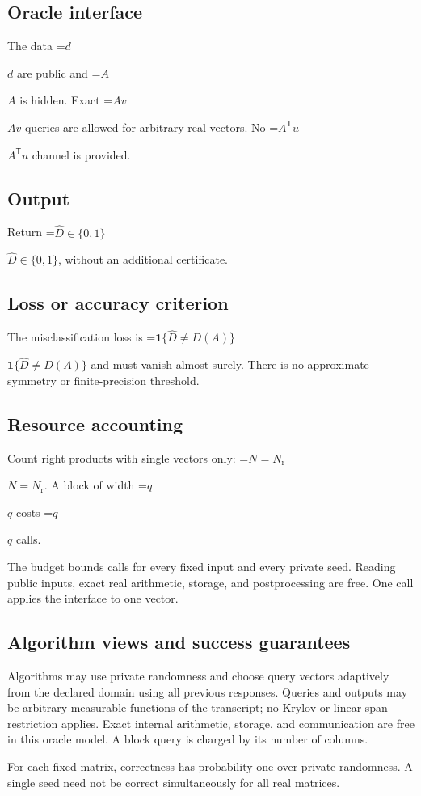 \documentclass[10pt,a4paper]{article}
\newcommand{\AtlasMath}[1]{\par\begingroup\centering\setbox0=\hbox{$\displaystyle #1$}\ifdim\wd0>1.4\linewidth\typeout{ATLAS WIDE FORMULA: \the\wd0}\fi\ifdim\wd0>\linewidth\resizebox{\linewidth}{!}{\box0}\else\box0\fi\par\endgroup}
\newcommand{\AtlasInlineMath}[1]{\begingroup\setbox0=\hbox{$#1$}\ifdim\wd0>.4\linewidth\endgroup\AtlasMath{#1}\else\endgroup$#1$\fi}
\begin{document}
\subsection{Oracle interface}
The data \AtlasInlineMath{d} are public and \AtlasInlineMath{A} is hidden. Exact \AtlasInlineMath{Av} queries are allowed for arbitrary real vectors. No \AtlasInlineMath{A^{\mathsf T}u} channel is provided.

\subsection{Output}
Return \AtlasInlineMath{\widehat D\in\{0,1\}}, without an additional certificate.

\subsection{Loss or accuracy criterion}
The misclassification loss is \AtlasInlineMath{\mathbf1\{\widehat{D}\ne D(A)\}} and must vanish almost surely. There is no approximate-symmetry or finite-precision threshold.

\subsection{Resource accounting}
Count right products with single vectors only: \AtlasInlineMath{N=N_{\mathrm r}}. A block of width \AtlasInlineMath{q} costs \AtlasInlineMath{q} calls.

The budget bounds calls for every fixed input and every private seed. Reading public inputs, exact real arithmetic, storage, and postprocessing are free. One call applies the interface to one vector.

\subsection{Algorithm views and success guarantees}
Algorithms may use private randomness and choose query vectors adaptively from the declared domain using all previous responses. Queries and outputs may be arbitrary measurable functions of the transcript; no Krylov or linear-span restriction applies. Exact internal arithmetic, storage, and communication are free in this oracle model. A block query is charged by its number of columns.

For each fixed matrix, correctness has probability one over private randomness. A single seed need not be correct simultaneously for all real matrices.
\end{document}
